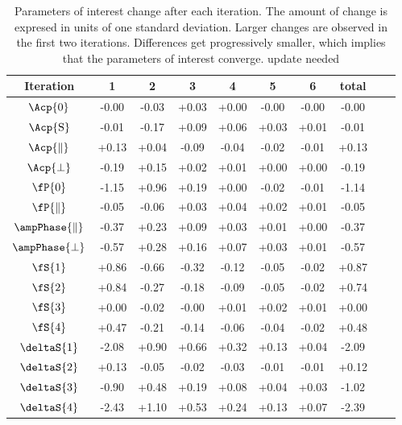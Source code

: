 \begin{table}[t]
\centering
\footnotesize
\begin{tabular}{ c c c c c c c c c | c}
  \hline
  Iteration          &       1       &       2       &       3       &       4       &       5       &       6  & total\\
  \hline
  $\Acp{0}$                           &  -0.00  &  -0.03  &  +0.03  &  +0.00  &  -0.00  &  -0.00  & -0.00   \\
  $\Acp{\text{S}}$                    &  -0.01  &  -0.17  &  +0.09  &  +0.06  &  +0.03  &  +0.01  & -0.01   \\
  $\Acp{\parallel}$                   &  +0.13  &  +0.04  &  -0.09  &  -0.04  &  -0.02  &  -0.01  & +0.13   \\
  $\Acp{\perp}$                       &  -0.19  &  +0.15  &  +0.02  &  +0.01  &  +0.00  &  +0.00  & -0.19 \\
  \hline
  $\fP{0}$                            &  -1.15  &  +0.96  &  +0.19  &  +0.00  &  -0.02  &  -0.01  & -1.14  \\
  $\fP{\parallel}$                    &  -0.05  &  -0.06  &  +0.03  &  +0.04  &  +0.02  &  +0.01  & -0.05  \\
  $\ampPhase{\parallel}$              &  -0.37  &  +0.23  &  +0.09  &  +0.03  &  +0.01  &  +0.00  & -0.37  \\
  $\ampPhase{\perp}$                  &  -0.57  &  +0.28  &  +0.16  &  +0.07  &  +0.03  &  +0.01  & -0.57 \\
  \hline
  $\fS{1}$                            &  +0.86  &  -0.66  &  -0.32  &  -0.12  &  -0.05  &  -0.02  & +0.87  \\
  $\fS{2}$                            &  +0.84  &  -0.27  &  -0.18  &  -0.09  &  -0.05  &  -0.02  & +0.74  \\
  $\fS{3}$                            &  +0.00  &  -0.02  &  -0.00  &  +0.01  &  +0.02  &  +0.01  & +0.00   \\
  $\fS{4}$                            &  +0.47  &  -0.21  &  -0.14  &  -0.06  &  -0.04  &  -0.02  & +0.48  \\
  $\deltaS{1}$                        &  -2.08  &  +0.90  &  +0.66  &  +0.32  &  +0.13  &  +0.04  & -2.09 \\
  $\deltaS{2}$                        &  +0.13  &  -0.05  &  -0.02  &  -0.03  &  -0.01  &  -0.01  & +0.12  \\
  $\deltaS{3}$                        &  -0.90  &  +0.48  &  +0.19  &  +0.08  &  +0.04  &  +0.03  & -1.02   \\
  $\deltaS{4}$                        &  -2.43  &  +1.10  &  +0.53  &  +0.24  &  +0.13  &  +0.07  & -2.39   \\
  \hline
\end{tabular}
\caption{Parameters of interest change after each iteration. The amount of change is expresed in units of one standard deviation.
         Larger changes are observed in the first two iterations. Differences get progressively smaller, which implies that the
         parameters of interest converge.{\color{red} update needed}}
\label{pars_convergence}
\end{table}

